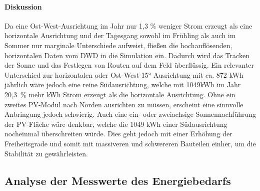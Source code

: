 \paragraph{Diskussion}
Da eine Ost-West-Ausrichtung im Jahr nur 1,3 \% weniger Strom erzeugt als eine horizontale Ausrichtung und der Tagesgang sowohl im Frühling als auch im Sommer nur marginale Unterschiede aufweist, fließen die hochauflösenden, horizontalen Daten vom DWD \cite{DWD2024Solar10min} in die Simulation ein. Dadurch wird das Tracken der Sonne und das Festlegen von Routen auf dem Feld überflüssig.
Ein relevanter Unterschied zur horizontalen oder Ost-West-15° Ausrichtung mit ca. 872 kWh jährlich wäre jedoch eine reine Südausrichtung, welche mit 1049kWh im Jahr 20,3~\% mehr kWh Strom erzeugt als die horizontale Ausrichtung. Ohne ein zweites PV-Modul nach Norden ausrichten zu müssen, erscheint eine sinnvolle Anbringung jedoch schwierig. Auch eine ein- oder zweiachsige Sonnennachführung der PV-Fläche wäre denkbar, welche die 1049 kWh einer Südausrichtung nocheinmal überschreiten würde. Dies geht jedoch mit einer Erhöhung der Freiheitsgrade und somit mit massiveren und schwereren Bauteilen einher, um die Stabilität zu gewährleisten.























































\subsection{Analyse der Messwerte des Energiebedarfs} \label{messwerte}
